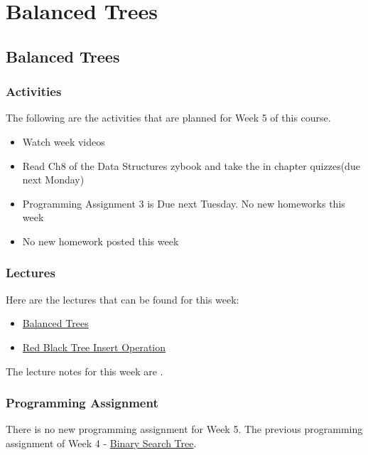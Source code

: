 \clearpage

\renewcommand{\ChapTitle}{Balanced Trees}

\chapter{\ChapTitle}
\section{\ChapTitle}

\subsection{Activities}

The following are the activities that are planned for Week 5 of this course.

\begin{itemize}
    \item Watch week videos
    \item Read Ch8 of the Data Structures zybook and take the in chapter quizzes(due next Monday)
    \item Programming Assignment 3 is Due next Tuesday. No new homeworks this week
    \item No new homework posted this week
\end{itemize}

\subsection{Lectures}

Here are the lectures that can be found for this week:

\begin{itemize}
    \item \href{https://applied.cs.colorado.edu/mod/hvp/view.php?id=45925}{Balanced Trees}
    \item \href{https://applied.cs.colorado.edu/mod/hvp/view.php?id=45926}{Red Black Tree Insert Operation}
\end{itemize}
The lecture notes for this week are .

\subsection{Programming Assignment}

There is no new programming assignment for Week 5. The previous programming assignment of Week 4 - \href{https://github.com/QuantumCompiler/CU/tree/main/CSPB%202270%20-%20Data%20Structures/CSPB%202270%20-%20Programming%20Assignments/CSPB%202270%20-%20Assignment%203%20-%20Binary%20Search%20Tree}{Binary Search Tree}.

